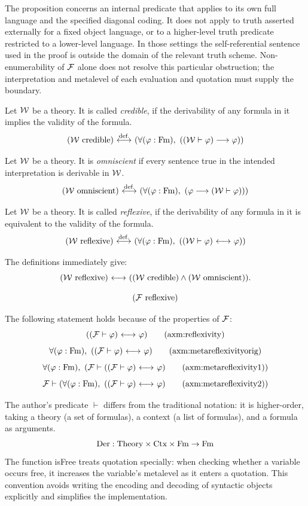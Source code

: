 The proposition concerns an internal predicate that applies to its own
full language and the specified diagonal coding. It does not apply to
truth asserted externally for a fixed object language, or to a
higher-level truth predicate restricted to a lower-level language. In
those settings the self-referential sentence used in the proof is outside
the domain of the relevant truth scheme. Non-enumerability of ${\mathcal{F}}$
alone does not resolve this particular obstruction; the interpretation
and metalevel of each evaluation and quotation must supply the boundary.

\begin{definition}
Let ${\mathcal{W}}$ be a theory. It is called \textit{credible}, if the derivability of any formula in it implies the validity of the formula.
\[
({\mathcal{W}}\text{ credible})
\ {\stackrel{{\textrm{def.}}}{\longleftrightarrow}}\ 
(\forall (\varphi:\mathrm{Fm}),\ (({\mathcal{W}}\vdash \varphi) \longrightarrow \varphi))
\]
\end{definition}
\begin{definition}
Let ${\mathcal{W}}$ be a theory. It is \textit{omniscient} if every sentence true
in the intended interpretation is derivable in ${\mathcal{W}}$.
\[
({\mathcal{W}}\text{ omniscient})
\ {\stackrel{{\textrm{def.}}}{\longleftrightarrow}}\ 
(\forall (\varphi:\mathrm{Fm}),\ (\varphi \longrightarrow ({\mathcal{W}}\vdash \varphi)))
\]
\end{definition}
\begin{definition}
Let ${\mathcal{W}}$ be a theory. It is called \textit{reflexive}, if the derivability of any formula in it is equivalent to the validity of the formula.
\[
({\mathcal{W}}\text{ reflexive})
\ {\stackrel{{\textrm{def.}}}{\longleftrightarrow}}\ 
(\forall (\varphi:\mathrm{Fm}),\ (({\mathcal{W}}\vdash \varphi) {\ \longleftrightarrow\ } \varphi))
\]
\end{definition}
The definitions immediately give:
\[
({\mathcal{W}}\text{ reflexive})
{\ \longleftrightarrow\ }
(
({\mathcal{W}}\text{ credible})
\land
({\mathcal{W}}\text{ omniscient})
).
\]
\begin{axiom}
\[
({\mathcal{F}}\text{ reflexive})
\]
\end{axiom}
\indent The following statement holds because of the properties of ${\mathcal{F}}$:
\[
((\Fau\vdash \phi) \iff \phi)
\labeltagd{axm}{reflexivity}
\]
\[
\forall (\phi:\Fm),\ %
((\Fau\vdash \phi) \iff \phi)
\labeltagd{axm}{metareflexivityorig}
\]
\[
\forall (\phi:\Fm),\ %
(
\Fau\vdash 
((\Fau\vdash \phi) \iff \phi)
\labeltagd{axm}{metareflexivity1}
)
\]
\[
\Fau \vdash 
(
\forall (\phi:\Fm),\ %
((\Fau\vdash \phi) \iff \phi)
\labeltagd{axm}{metareflexivity2}
)
\]

\begin{note}
The author's predicate $\vdash$ differs from the traditional notation: it is higher-order, taking a theory (a set of formulas), a context (a list of formulas), and a formula as arguments.
\[
\text{Der} : \text{Theory} \times \text{Ctx} \times \mathrm{Fm} \to \mathrm{Fm}
\]
The function isFree treats quotation specially: when checking whether a variable occurs free, it increases the variable's metalevel as it enters a quotation. %
This convention avoids writing the encoding and decoding of syntactic objects explicitly and simplifies the implementation.%
\end{note}

